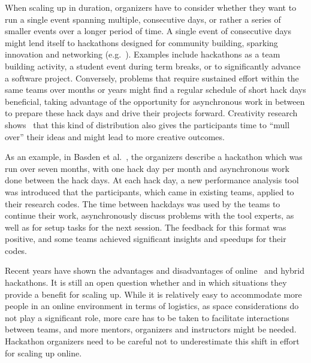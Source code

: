 \documentclass{ieeeaccess}
\begin{document}
When scaling up in duration, organizers have to consider whether they want to run a single event spanning multiple, consecutive days, or rather a series of smaller events over a longer period of time. 
A single event of consecutive days might lend itself to hackathons designed for community building, sparking innovation and networking (e.g.~\cite{huppenkothen2018hack}). Examples include hackathons as a team building activity, a student event during term breaks, or to significantly advance a software project. Conversely, problems that require sustained effort within the same teams over months or years might find a regular schedule of short hack days beneficial, taking advantage of the opportunity for asynchronous work in between to prepare these hack days and drive their projects forward. Creativity research shows~\cite{boden2004creative} that this kind of distribution also gives the participants time to ``mull over'' their ideas and might lead to more creative outcomes.

As an example, in Basden et al.~\cite{basden2021performancews}, the organizers describe a hackathon which was run over seven months, with one hack day per month and asynchronous work done between the hack days. At each hack day, a new performance analysis tool was introduced that the participants, which came in existing teams, applied to their research codes. The time between hackdays was used by the teams to continue their work, asynchronously discuss problems with the tool experts, as well as for setup tasks for the next session. The feedback for this format was positive, and some teams achieved significant insights and speedups for their codes. 

Recent years have shown the advantages and disadvantages of online~\cite{mendes2022socio} and hybrid hackathons. It is still an open question whether and in which situations they provide a benefit for scaling up. While it is relatively easy to accommodate more people in an online environment in terms of logistics, as space considerations do not play a significant role, more care has to be taken to facilitate interactions between teams, and more mentors, organizers and instructors might be needed. Hackathon organizers need to be careful not to underestimate this shift in effort for scaling up online.
\end{document}
